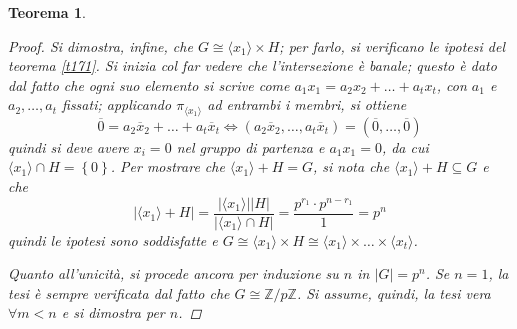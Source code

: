 \documentclass[12pt]{scrartcl}
\theoremstyle{style}
\newtheorem{teorema}{Teorema}[section]
\numberwithin{equation}{subsection}
\begin{document}
\begin{teorema}
\begin{proof}
Si dimostra, infine, che $G \cong \langle x_1  \rangle\times H $; per farlo, si verificano le ipotesi del teorema \ref{t171}.
Si inizia col far vedere che l'intersezione \`e banale; questo \`e dato dal fatto che ogni suo elemento si scrive come $a_1x_1 = a_2x_2+ \ldots + a_t x_t$, con $a_1$ e $a_2,\ldots,a_t$ fissati; applicando $\pi_{\langle x_1 \rangle} $ ad entrambi i membri, si ottiene
\[
\overline{0} = a_2 \overline{x}_2 + \ldots + a_t \overline{x}_t \iff (a_2 \overline{x}_2,\ldots, a_t \overline{x}_t) = (\overline{0},\ldots,\overline{0})
\] 
quindi si deve avere $x_i = 0$ nel gruppo di partenza e $a_1 x_1=0$, da cui $\langle x_1 \rangle\cap H = \left\{ 0 \right\} $.
Per  mostrare che $\langle x_1 \rangle+  H = G$, si nota che $\langle x_1 \rangle+ H \subseteq G$ e che
\[
\lvert \langle x_1 \rangle+ H  \rvert = \frac{\lvert \langle x_1 \rangle \rvert \lvert H \rvert }{\lvert \langle x_1 \rangle \cap H\rvert } = \frac{p^{r_1} \cdot p^{n-r_1} }{1}=p^n
\] 
quindi le ipotesi sono soddisfatte e $G \cong \langle x_1 \rangle\times H \cong \langle x_1 \rangle \times  \ldots \times\langle x_t \rangle $.

Quanto all'unicit\`a, si procede ancora per induzione su $n$ in $\lvert G \rvert  = p^n$.
Se $n=1$, la tesi \`e sempre verificata dal fatto che $G \cong \mathbb{Z} / p\mathbb{Z}$.
Si assume, quindi, la tesi vera $\forall m < n$ e si dimostra per $n$.


\end{proof}
\end{teorema}
\end{document}
